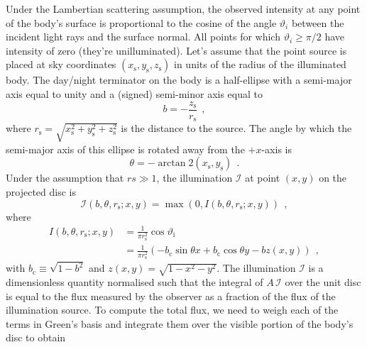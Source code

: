 \documentclass[12pt,dvipsnames]{report}
\newcommand{\hquad}{~~}
\begin{document}
Under the Lambertian scattering assumption, the observed intensity at any point
of the body's surface is proportional to the cosine of the angle
$\vartheta_i$ between the incident light rays and the surface normal. All
points for which $\vartheta_i\geq \pi/2$ have intensity of zero (they're
unilluminated). Let's assume that the point source is placed at sky coordinates
$\left(x_{\mathrm{s}}, y_{\mathrm{s}}, z_{\mathrm{s}}\right)$ in units of the
radius of the illuminated body. The day/night terminator on the body is a
half-ellipse with a semi-major axis equal to unity and a (signed) semi-minor
axis equal to
\begin{equation}
    b=-\frac{z_{\mathrm{s}}}{r_{\mathrm{s}}}
    \hquad,
\end{equation}
where $r_{\mathrm{s}}=\sqrt{x_{\mathrm{s}}^{2}+y_{\mathrm{s}}^{2}+z_{\mathrm{s}}^{2}}$
is the distance to the source. The angle by which the semi-major axis of this ellipse is
rotated away from the $+x$-axis  is
\begin{equation}
    \theta=-\arctan 2\left(x_{\mathrm{s}}, y_{\mathrm{s}}\right)
    \hquad.
\end{equation}
Under the assumption that $rs \gg 1$, the illumination $\mathcal{I}$ at point
$(x,y)$ on the projected disc is \citep{2021arXiv210306275L}
\begin{equation}
    \mathcal{I}\left(b, \theta, r_{\mathrm{s}} ; x, y\right)=\max \left(0, I\left(b, \theta, r_{\mathrm{s}} ; x, y\right)\right)
    \hquad,
    \label{eq:illumination}
\end{equation}
where
\begin{align}
    I\left(b, \theta, r_{\mathrm{s}} ; x, y\right) & =\frac{1}{\pi r_{\mathrm{s}}^{2}} \cos \vartheta_{\mathrm{i}}                                                      \\
                                                   & =\frac{1}{\pi r_{\mathrm{s}}^{2}}\left(-b_{\mathrm{c}} \sin \theta x+b_{\mathrm{c}} \cos \theta y-b z(x, y)\right)
                                                   \hquad,
\end{align}
with  $b_{\mathrm{c}} \equiv \sqrt{1-b^{2}}$  and $z(x, y)=\sqrt{1-x^{2}-y^{2}}$.
The illumination $\mathcal{I}$ is a dimensionless quantity normalised such that the
integral of $A\,\mathcal{I}$ over the unit disc is equal to the flux measured by the
observer as a fraction of the flux of the illumination source.
To compute the total flux, we need to weigh each of the terms in Green's basis
and integrate them over the visible portion of the body's disc to obtain
\end{document}
